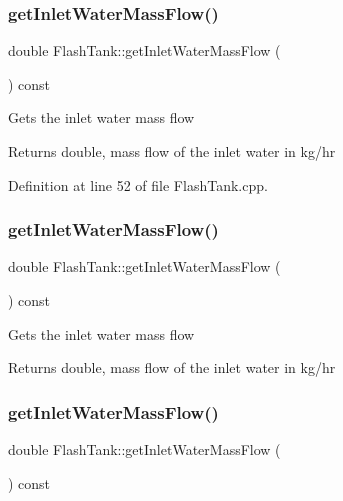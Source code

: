 \subsubsection{\texorpdfstring{get\+Inlet\+Water\+Mass\+Flow()}{getInletWaterMassFlow()}\hspace{0.1cm}{\footnotesize\ttfamily [1/3]}}
{\footnotesize\ttfamily double Flash\+Tank\+::get\+Inlet\+Water\+Mass\+Flow (\begin{DoxyParamCaption}{ }\end{DoxyParamCaption}) const}

Gets the inlet water mass flow \begin{DoxyReturn}{Returns}
double, mass flow of the inlet water in kg/hr 
\end{DoxyReturn}


Definition at line 52 of file Flash\+Tank.\+cpp.

\mbox{\label{class_flash_tank_a2b6dcd9e175a9f2fc550ea91006aa66a}} 
\subsubsection{\texorpdfstring{get\+Inlet\+Water\+Mass\+Flow()}{getInletWaterMassFlow()}\hspace{0.1cm}{\footnotesize\ttfamily [2/3]}}
{\footnotesize\ttfamily double Flash\+Tank\+::get\+Inlet\+Water\+Mass\+Flow (\begin{DoxyParamCaption}{ }\end{DoxyParamCaption}) const}

Gets the inlet water mass flow \begin{DoxyReturn}{Returns}
double, mass flow of the inlet water in kg/hr 
\end{DoxyReturn}
\mbox{\label{class_flash_tank_a2b6dcd9e175a9f2fc550ea91006aa66a}} 
\subsubsection{\texorpdfstring{get\+Inlet\+Water\+Mass\+Flow()}{getInletWaterMassFlow()}\hspace{0.1cm}{\footnotesize\ttfamily [3/3]}}
{\footnotesize\ttfamily double Flash\+Tank\+::get\+Inlet\+Water\+Mass\+Flow (\begin{DoxyParamCaption}{ }\end{DoxyParamCaption}) const}

